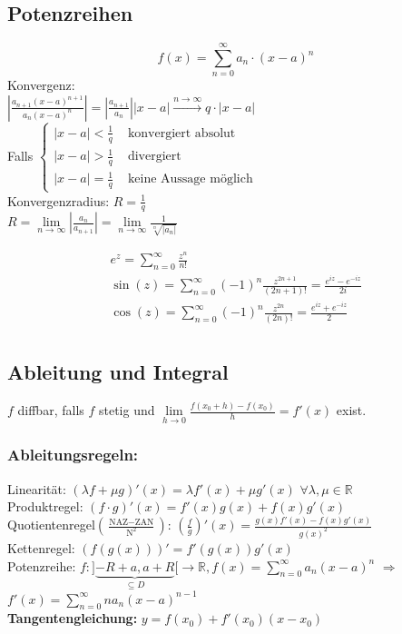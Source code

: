 \documentclass[6pt,a4paper]{scrartcl}
\newcommand{\abs}[1]{\ensuremath{\left\vert#1\right\vert}}
\newcommand{\enbrace}[1]{\ensuremath{\left(#1\right)}}
\begin{document}
\begin{multicols}{4}
\subsection{Potenzreihen} %
\begin{equation*}
f(x)=\sum_{n=0}^\infty a_n \cdot (x-a)^n
\end{equation*}
Konvergenz:\\
$\abs{\frac{a_{n+1} (x-a)^{n+1}}{a_n (x-a)^n}} = \abs{\frac{a_{n+1}}{a_n}}\abs{x-a} \overset{n \rightarrow \infty}{\rightarrow} q \cdot \abs{x -a}$\\
Falls $\begin{cases}  \abs{x-a} < \frac{1}{q} & \text{ konvergiert absolut}\\
	\abs{x-a} > \frac{1}{q} & \text{ divergiert} \\
	\abs{x-a} = \frac{1}{q}  & \text{ keine Aussage möglich}
	\end{cases}$\\
Konvergenzradius: $R=\frac{1}{q}$\\
$R = \underset{n\rightarrow \infty}{\lim} \abs{\frac{a_n}{a_{n+1}}}=\lim\limits_{n\rightarrow \infty}\frac{1}{\sqrt[n]{\abs{a_n}}}$

\label{sub:potenzreihen}
 \begin{eqnarray*}
 	e^z = \sum_{n = 0}^{\infty} \frac{z^n}{n!}\\
	\sin (z) = \sum_{n = 0}^{\infty} (-1)^n \frac{z^{2n +1}}{(2n +1)!} = \frac{e^{iz} - e^{-iz}}{2i} \\
	\cos (z) = \sum_{n = 0}^{\infty} (-1)^n \frac{z^{2n}}{(2n)!} = \frac{e^{iz} + e^{-iz}}{2}\\
 \end{eqnarray*}





\subsection{Ableitung und Integral}
$f$ diffbar, falls $f$ stetig und $\underset{h\rightarrow 0}{\lim}\frac{f(x_0+h)-f(x_0)}{h}=f'(x)$ exist.
\subsubsection{Ableitungsregeln:}
Linearität: $(\lambda f + \mu g)' (x) = \lambda f'(x) + \mu g'(x)$ \quad $\forall \lambda, \mu \in \mathbb R$ \\
Produktregel: $(f \cdot g)'(x) = f'(x) g(x) + f(x) g'(x)$\\
Quotientenregel$\enbrace{\frac{\text{NAZ}-\text{ZAN}}{\text{N}^2}}$: $\enbrace{\frac{f}{g}}' (x) = \frac{g(x)f'(x) -f(x) g'(x)}{g(x)^2}$\\
Kettenregel: $\left( f(g(x)) \right)' = f'(g(x)) g'(x)$\\
Potenzreihe: $f: ] \underbrace{-R+a, a+R}_{\subseteq D}	 [ \rightarrow \mathbb R, f(x) = \sum_{n=0}^{\infty} a_n (x -a)^n$ \quad $\Rightarrow$ \quad $f'(x) = \sum_{n=0}^{\infty} n a_{n} (x-a)^{n-1}$\\
\textbf{Tangentengleichung:} $y=f(x_0)+f'(x_0)(x-x_0)$


\end{multicols}
\end{document}
